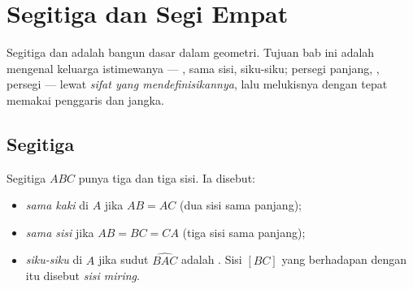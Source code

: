 \chapter{Segitiga dan Segi Empat}\label{ch:g6:shapes}

Segitiga dan  adalah bangun dasar dalam geometri. Tujuan bab
ini adalah mengenal keluarga istimewanya --- , sama
sisi, siku-siku; persegi panjang, , persegi --- lewat
\emph{sifat yang mendefinisikannya}, lalu melukisnya dengan tepat
memakai penggaris dan jangka.

\section{Segitiga}

\begin{definition}\label{def:g6:shapes:triangles}
Segitiga $ABC$ punya tiga  dan tiga sisi. Ia disebut:
\begin{itemize}
  \item \emph{sama kaki} di $A$ jika
        $AB = AC$ (dua sisi sama panjang);
  \item \emph{sama sisi} jika
        $AB = BC = CA$ (tiga sisi sama panjang);
  \item \emph{siku-siku} di $A$ jika sudut
        $\widehat{BAC}$ adalah . Sisi $[BC]$ yang
        berhadapan dengan  itu disebut \emph{sisi miring}.
\end{itemize}
\end{definition}

